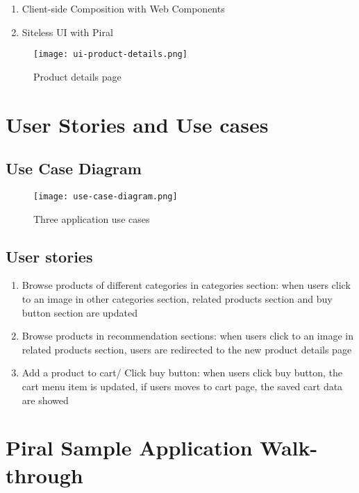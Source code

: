 \documentclass[a4paper]{book}
\begin{document}
\begin{enumerate}
    \item Client-side Composition with Web Components
    \item Siteless UI with Piral
\end{enumerate}


\begin{figure}[h!]
    \centering
    \captionsetup{justification=centering}
    \texttt{[image: ui-product-details.png]}
    \caption{Product details page}
    \label{fig:ui-product-details}
\end{figure}

\section{User Stories and Use cases} \label{User Stories and Use cases}

\subsection{Use Case Diagram}
\begin{figure}[ht]
  \centering
  \captionsetup{justification=centering}
  \texttt{[image: use-case-diagram.png]}
  \caption{Three application use cases}
  \label{fig:use-case-diagram}
\end{figure}

\subsection{User stories}

\begin{enumerate}
    \item Browse products of different categories in categories section: when users click to an image in other categories section, related products section and buy button section are updated
    \item Browse products in recommendation sections: when users click to an image in related products section, users are redirected to the new product details page
    \item Add a product to cart/ Click buy button: when users click buy button, the cart menu item is updated, if users moves to cart page, the saved cart data are showed
\end{enumerate}

\section{Piral Sample Application Walk-through} \label{Piral Application}
\end{document}
